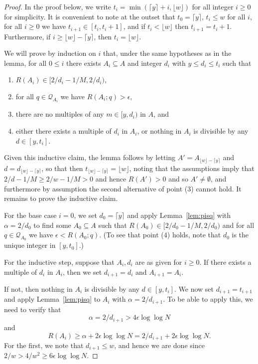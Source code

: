 \begin{proof}
\leanok
{}
In the proof below, we write $t_i=\min(\lceil y\rceil +i, \lfloor w\rfloor)$ for all integer $i\geq 0$ for simplicity. It is convenient to note at the outset that $t_0=\lceil y\rceil$, $t_i\leq w$ for all $i$, for all $i\geq 0$ we have $t_{i+1}\in [t_i,t_i+1]$, and if $t_i< \lfloor w\rfloor$ then $t_{i+1}=t_i+1$. Furthermore, if $i\geq \lfloor w\rfloor -\lceil y\rceil$, then $t_i=\lfloor w\rfloor$.

We will prove by induction on $i$ that, under the same hypotheses as in the lemma, for all $0\leq i$ there exists $ A_i\subseteq A$ and integer $d_i$ with $y\leq d_i\leq t_i$ such that
\begin{enumerate}
\item $R(A_i) \in [2/d_i-1/M, 2/d_i)$,
\item for all $q\in \mathcal{Q}_{A_i}$ we have $R(A_i;q)> \epsilon$,
\item there are no multiples of any $m\in [y,d_i)$ in $A$, and
\item either there exists a multiple of $d_i$ in $A_i$, or nothing in $A_i$ is divisible by any $d\in [y,t_i]$.
\end{enumerate}

Given this inductive claim, the lemma follows by letting $A' = A_{\lfloor w\rfloor -\lceil y\rceil}$ and $d=d_{\lfloor w\rfloor -\lceil y\rceil}$, so that then $t_{\lfloor w\rfloor -\lceil y\rceil}=\lfloor w\rfloor$, noting that the assumptions imply that $2/d-1/M\geq 2/w-1/M>0$ and hence $R(A')>0$ and so $A'\neq\emptyset$, and furthermore by assumption the second alternative of point (3) cannot hold. It remains to prove the inductive claim.

For the base case $i=0$, we set $d_0=\lceil y\rceil$ and apply Lemma~\ref{lem:pisq} with $\alpha=2/d_0$ to find some $A_0\subseteq A$ such that $R(A_0)\in[2/d_0-1/M,2/d_0)$ and for all $q\in \mathcal{Q}_{A_0}$ we have $\epsilon < R(A_0;q)$. (To see that point (4) holds, note that $d_0$ is the unique integer in $[y,t_0]$.)

For the inductive step, suppose that $A_i,d_i$ are as given for $i\geq 0$. If there exists a multiple of $d_i$ in $A_i$, then we set $d_{i+1}=d_i$ and $A_{i+1}=A_i$.

If not, then nothing in $A_i$ is divisible by any $d\in [y,t_i]$. We now set $d_{i+1}=t_{i+1}$ and apply Lemma~\ref{lem:pisq} to $A_i$ with $\alpha=2/d_{i+1}$. To be able to apply this, we need to verify that
\[\alpha=2/d_{i+1}> 4\epsilon\log\log N\]
and
\[R(A_i)\geq \alpha+2\epsilon\log\log N= 2/d_{i+1}+2\epsilon\log\log N.\]
For the first, we note that $d_{i+1}\leq w$, and hence we are done since $2/w>4/w^2\geq  6\epsilon\log\log N$.


\end{proof}
